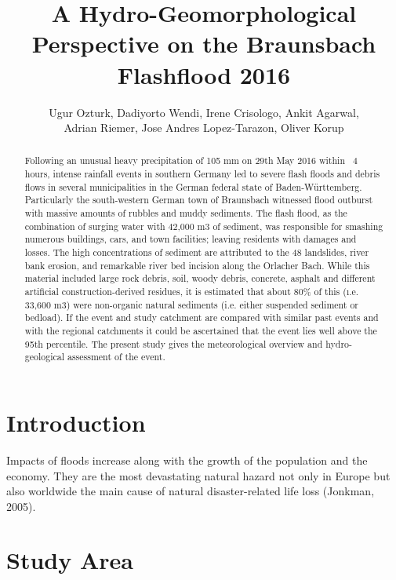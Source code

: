 \documentclass[10pt]{article}
\begin{document}
\title{A Hydro-Geomorphological Perspective on the Braunsbach Flashflood 2016}
\author{Ugur Ozturk, Dadiyorto Wendi, Irene Crisologo, Ankit Agarwal, \\
Adrian Riemer, Jose Andres Lopez-Tarazon, Oliver Korup}
\date{}

\maketitle


\begin{abstract}

Following an unusual heavy precipitation of 105 mm on 29th May 2016 within ~4 hours, intense rainfall events in southern Germany led to severe flash floods and debris flows in several municipalities in the German federal state of Baden-W{\"u}rttemberg. Particularly the south-western German town of Braunsbach witnessed flood outburst with massive amounts of rubbles and muddy sediments. The flash flood, as the combination of surging water with 42,000 m3 of sediment, was responsible for smashing numerous buildings, cars, and town facilities; leaving residents with damages and losses. The high concentrations of sediment are attributed to the 48 landslides, river bank erosion, and remarkable river bed incision along the Orlacher Bach.  While this material included large rock debris, soil, woody debris, concrete, asphalt and different artificial construction-derived residues, it is estimated that about 80\% of this (\i.e. 33,600 m3) were non-organic natural sediments (i.e. either suspended sediment or bedload). If the event and study catchment are compared with similar past events and with the regional catchments it could be ascertained that the event lies well above the 95th percentile. The present study gives the meteorological overview and hydro-geological assessment of the event.

\end{abstract}

\section{Introduction}

Impacts of floods increase along with the growth of the population and the economy. They are the most devastating natural hazard not only in Europe but also worldwide the main cause of natural disaster-related life loss (Jonkman, 2005).

\section{Study Area}
\end{document}
